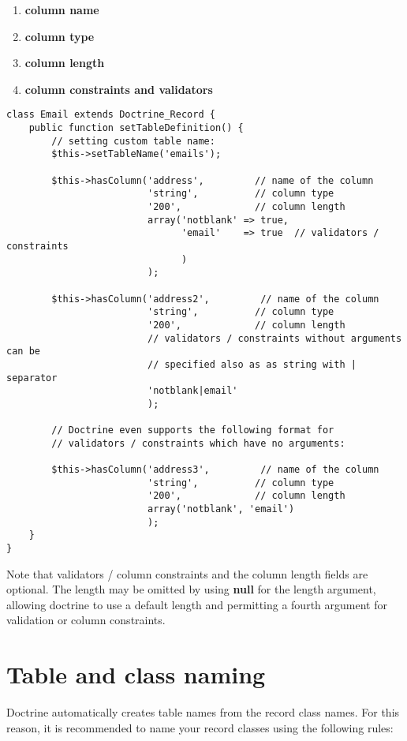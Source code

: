 \documentclass[11pt,a4paper]{report}
\begin{document}
\renewcommand{\labelenumi}{\arabic{enumi}}
\begin{enumerate}
\item{\textbf{column name}}
\item{\textbf{column type}}
\item{\textbf{column length}}
\item{\textbf{column constraints and validators}}
\end{enumerate}
\begin{verbatim}
class Email extends Doctrine_Record {
    public function setTableDefinition() {
        // setting custom table name:
        $this->setTableName('emails');

        $this->hasColumn('address',         // name of the column
                         'string',          // column type
                         '200',             // column length
                         array('notblank' => true,
                               'email'    => true  // validators / constraints
                               )
                         );

        $this->hasColumn('address2',         // name of the column
                         'string',          // column type
                         '200',             // column length
                         // validators / constraints without arguments can be
                         // specified also as as string with | separator
                         'notblank|email'
                         );

        // Doctrine even supports the following format for
        // validators / constraints which have no arguments:

        $this->hasColumn('address3',         // name of the column
                         'string',          // column type
                         '200',             // column length
                         array('notblank', 'email')
                         );
    }
}
\end{verbatim}

Note that validators / column constraints and the column length fields are optional.  The length may be omitted by using \textbf{null} for the length argument, allowing doctrine to use a default length and permitting a fourth argument for validation or column constraints.

\section{Table and class naming}
Doctrine automatically creates table names from the record class names. For this reason, it is recommended to name your record classes using the following rules:
\end{document}
